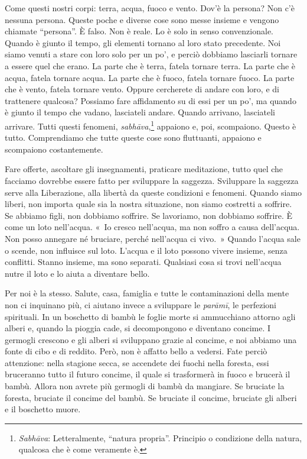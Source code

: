 Come questi nostri corpi: terra, acqua, fuoco e vento. Dov'è la persona?
Non c'è nessuna persona. Queste poche e diverse cose sono messe insieme
e vengono chiamate ``persona''. È falso. Non è reale. Lo è solo in senso
convenzionale. Quando è giunto il tempo, gli elementi tornano al loro
stato precedente. Noi siamo venuti a stare con loro solo per un po', e
perciò dobbiamo lasciarli tornare a essere quel che erano. La parte che
è terra, fatela tornare terra. La parte che è acqua, fatela tornare
acqua. La parte che è fuoco, fatela tornare fuoco. La parte che è vento,
fatela tornare vento. Oppure cercherete di andare con loro, e di
trattenere qualcosa? Possiamo fare affidamento su di essi per un po', ma
quando è giunto il tempo che vadano, lasciateli andare. Quando arrivano,
lasciateli arrivare. Tutti questi fenomeni, \emph{sabhāva},\footnote{\emph{Sabhāva}:
  Letteralmente, ``natura propria''. Principio o condizione della
  natura, qualcosa che è come veramente è.} appaiono e, poi, scompaiono.
Questo è tutto. Comprendiamo che tutte queste cose sono fluttuanti,
appaiono e scompaiono costantemente.

Fare offerte, ascoltare gli insegnamenti, praticare meditazione, tutto
quel che facciamo dovrebbe essere fatto per sviluppare la saggezza.
Sviluppare la saggezza serve alla Liberazione, alla libertà da queste
condizioni e fenomeni. Quando siamo liberi, non importa quale sia la
nostra situazione, non siamo costretti a soffrire. Se abbiamo figli, non
dobbiamo soffrire. Se lavoriamo, non dobbiamo soffrire. È come un loto
nell'acqua. «~Io cresco nell'acqua, ma non soffro a causa dell'acqua.
Non posso annegare né bruciare, perché nell'acqua ci vivo.~» Quando
l'acqua sale o scende, non influisce sul loto. L'acqua e il loto possono
vivere insieme, senza conflitti. Stanno insieme, ma sono separati.
Qualsiasi cosa si trovi nell'acqua nutre il loto e lo aiuta a diventare
bello.

Per noi è la stesso. Salute, casa, famiglia e tutte le contaminazioni
della mente non ci inquinano più, ci aiutano invece a sviluppare le
\emph{parāmī}, le perfezioni spirituali. In un boschetto di bambù le
foglie morte si ammucchiano attorno agli alberi e, quando la pioggia
cade, si decompongono e diventano concime. I germogli crescono e gli
alberi si sviluppano grazie al concime, e noi abbiamo una fonte di cibo
e di reddito. Però, non è affatto bello a vedersi. Fate perciò
attenzione: nella stagione secca, se accendete dei fuochi nella foresta,
essi bruceranno tutto il futuro concime, il quale si trasformerà in
fuoco e brucerà il bambù. Allora non avrete più germogli di bambù da
mangiare. Se bruciate la foresta, bruciate il concime del bambù. Se
bruciate il concime, bruciate gli alberi e il boschetto muore.

